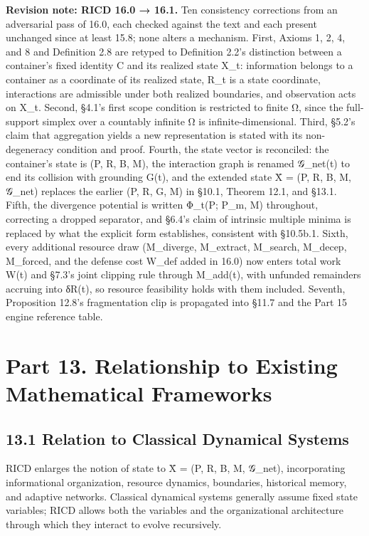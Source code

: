 \documentclass[
]{article}
\begin{document}
\textbf{Revision note: RICD 16.0 → 16.1.} Ten consistency corrections
from an adversarial pass of 16.0, each checked against the text and each
present unchanged since at least 15.8; none alters a mechanism. First,
Axioms 1, 2, 4, and 8 and Definition 2.8 are retyped to Definition 2.2's
distinction between a container's fixed identity C and its realized
state X\_t: information belongs to a container as a coordinate of its
realized state, R\_t is a state coordinate, interactions are admissible
under both realized boundaries, and observation acts on X\_t. Second,
§4.1's first scope condition is restricted to finite Ω, since the
full-support simplex over a countably infinite Ω is
infinite-dimensional. Third, §5.2's claim that aggregation yields a new
representation is stated with its non-degeneracy condition and proof.
Fourth, the state vector is reconciled: the container's state is (P, R,
B, M), the interaction graph is renamed 𝒢\_net(t) to end its collision
with grounding G(t), and the extended state X̄ = (P, R, B, M, 𝒢\_net)
replaces the earlier (P, R, G, M) in §10.1, Theorem 12.1, and §13.1.
Fifth, the divergence potential is written Φ\_t(P; P\_m, M) throughout,
correcting a dropped separator, and §6.4's claim of intrinsic multiple
minima is replaced by what the explicit form establishes, consistent
with §10.5b.1. Sixth, every additional resource draw (M\_diverge,
M\_extract, M\_search, M\_decep, M\_forced, and the defense cost W\_def
added in 16.0) now enters total work W(t) and §7.3's joint clipping rule
through M\_add(t), with unfunded remainders accruing into δR(t), so
resource feasibility holds with them included. Seventh, Proposition
12.8's fragmentation clip is propagated into §11.7 and the Part 15
engine reference table.

\hypertarget{part-13.-relationship-to-existing-mathematical-frameworks}{%
\section{Part 13. Relationship to Existing Mathematical
Frameworks}\label{part-13.-relationship-to-existing-mathematical-frameworks}}

\hypertarget{relation-to-classical-dynamical-systems}{%
\subsection{13.1 Relation to Classical Dynamical
Systems}\label{relation-to-classical-dynamical-systems}}

RICD enlarges the notion of state to X̄ = (P, R, B, M, 𝒢\_net),
incorporating informational organization, resource dynamics, boundaries,
historical memory, and adaptive networks. Classical dynamical systems generally assume fixed
state variables; RICD allows both the variables and the organizational
architecture through which they interact to evolve recursively.
\end{document}
